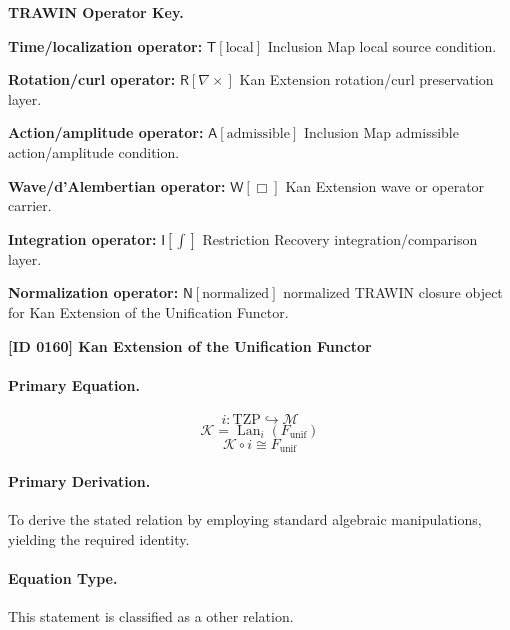 \par\vspace{0.45\baselineskip}
\noindent\begin{minipage}[t]{\linewidth}
\begingroup
\small
\raggedright
\textbf{TRAWIN Operator Key.}\par
\noindent\textbf{Time/localization operator:} $\mathsf{T}\!\left[\mathrm{local}\right]$ Inclusion Map local source condition.\par
\noindent\textbf{Rotation/curl operator:} $\mathsf{R}\!\left[\nabla\times\right]$ Kan Extension rotation/curl preservation layer.\par
\noindent\textbf{Action/amplitude operator:} $\mathsf{A}\!\left[\mathrm{admissible}\right]$ Inclusion Map admissible action/amplitude condition.\par
\noindent\textbf{Wave/d'Alembertian operator:} $\mathsf{W}\!\left[\Box\right]$ Kan Extension wave or operator carrier.\par
\noindent\textbf{Integration operator:} $\mathsf{I}\!\left[\int\right]$ Restriction Recovery integration/comparison layer.\par
\noindent\textbf{Normalization operator:} $\mathsf{N}\!\left[\mathrm{normalized}\right]$ normalized TRAWIN closure object for Kan Extension of the Unification Functor.\par
\endgroup
\end{minipage}

\clearpage
\noindent\textbf{[ID 0160] Kan Extension of the Unification Functor}\par
\vspace{0.35em}
\paragraph{Primary Equation.}
\[
i:\mathrm{TZP}\hookrightarrow \mathcal{M}
\]
\[
\mathcal{K}
=
\operatorname{Lan}_{i}\!\left(F_{\mathrm{unif}}\right)
\]
\[
\mathcal{K}\circ i\cong F_{\mathrm{unif}}
\]

\paragraph{Primary Derivation.}
To derive the stated relation by employing standard algebraic manipulations, yielding the required identity.
\paragraph{Equation Type.}
This statement is classified as a other relation.

